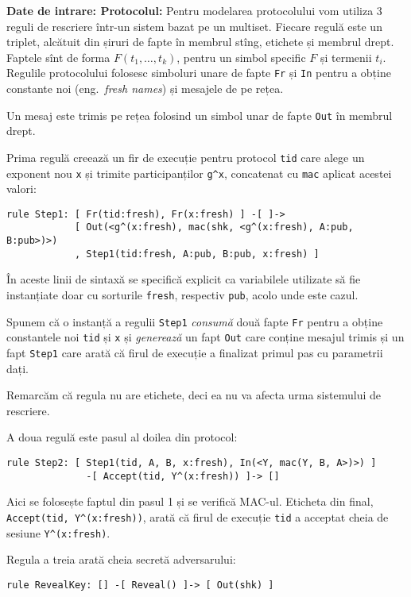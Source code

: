 \textbf{Date de intrare: Protocolul:} Pentru modelarea protocolului vom
utiliza 3 reguli de rescriere într-un sistem bazat pe un multiset.
Fiecare regulă este un triplet, alcătuit din șiruri de fapte în membrul
stîng, etichete și membrul drept. Faptele sînt de forma $ F(t_1, \dots, t_k) $,
pentru un simbol specific $ F $ și termenii $ t_i $. Regulile protocolului
folosesc simboluri unare de fapte \texttt{Fr} și \texttt{In} pentru a
obține constante noi (eng.\ \emph{fresh names}) și mesajele de pe
rețea.

Un mesaj este trimis pe rețea folosind un simbol unar de fapte \texttt{Out}
în membrul drept.

Prima regulă creează un fir de execuție pentru protocol \texttt{tid}
care alege un exponent nou \texttt{x} și trimite participanților \texttt{g\^{}x},
concatenat cu \texttt{mac} aplicat acestei valori:

\begin{verbatim}
rule Step1: [ Fr(tid:fresh), Fr(x:fresh) ] -[ ]->
            [ Out(<g^(x:fresh), mac(shk, <g^(x:fresh), A:pub, B:pub>)>)
            , Step1(tid:fresh, A:pub, B:pub, x:fresh) ]
\end{verbatim}

În aceste linii de sintaxă se specifică explicit ca variabilele utilizate
să fie instanțiate doar cu sorturile \texttt{fresh}, respectiv \texttt{pub},
acolo unde este cazul.

Spunem că o instanță a regulii \texttt{Step1} \emph{consumă} două fapte
\texttt{Fr} pentru a obține constantele noi \texttt{tid} și \texttt{x}
și \emph{generează} un fapt \texttt{Out} care conține mesajul trimis
și un fapt \texttt{Step1} care arată că firul de execuție a finalizat
primul pas cu parametrii dați.

Remarcăm că regula nu are etichete, deci ea nu va afecta urma sistemului
de rescriere.

A doua regulă este pasul al doilea din protocol:

\begin{verbatim}
rule Step2: [ Step1(tid, A, B, x:fresh), In(<Y, mac(Y, B, A>)>) ]
              -[ Accept(tid, Y^(x:fresh)) ]-> []
\end{verbatim}

Aici se folosește faptul din pasul 1 și se verifică MAC-ul.
Eticheta din final, \texttt{Accept(tid, Y\^{}(x:fresh))}, arată
că firul de execuție \texttt{tid} a acceptat cheia de sesiune
\texttt{Y\^{}(x:fresh)}.

Regula a treia arată cheia secretă adversarului:
\begin{verbatim}
rule RevealKey: [] -[ Reveal() ]-> [ Out(shk) ]
\end{verbatim}


